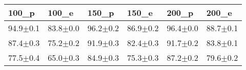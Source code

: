 \begin{tabular}{llllll}
\toprule
100_p & 100_e & 150_p & 150_e & 200_p & 200_e \\
\midrule
94.9$\pm$0.1 & 83.8$\pm$0.0 & 96.2$\pm$0.2 & 86.9$\pm$0.2 & 96.4$\pm$0.0 & 88.7$\pm$0.1 \\
87.4$\pm$0.3 & 75.2$\pm$0.2 & 91.9$\pm$0.3 & 82.4$\pm$0.3 & 91.7$\pm$0.2 & 83.8$\pm$0.1 \\
77.5$\pm$0.4 & 65.0$\pm$0.3 & 84.9$\pm$0.3 & 75.3$\pm$0.3 & 87.2$\pm$0.2 & 79.6$\pm$0.2 \\
\bottomrule
\end{tabular}
